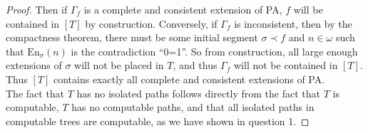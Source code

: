 \documentclass{article}
\begin{document}
\begin{enumerate}[label={\bf Q\arabic*:}]
\begin{proof}
      Then if $\Gamma_f$ is a complete and consistent extension of PA, $f$
      will be contained in $[T]$ by construction. Conversely, if $\Gamma_f$
      is inconsistent, then by the compactness theorem, there must be some
      initial segment $\sigma\prec f$ and $n\in\omega$ such that
      $\text{En}_\sigma(n)$ is the contradiction ``0=1''. So from
      construction, all large enough extensions of $\sigma$ will not be
      placed in $T$, and thus $\Gamma_f$ will not be contained in $[T]$.
      Thus $[T]$ contains exactly all complete and consistent extensions of
      PA. \\

      The fact that $T$ has no isolated paths follows directly from the
      fact that $T$ is computable, $T$ has no computable paths, and that
      all isolated paths in computable trees are computable, as we have
      shown in question 1.
    \end{proof}
\end{enumerate}
\end{document}

